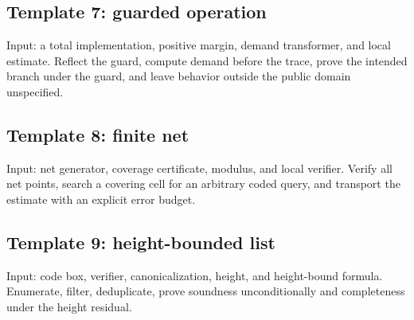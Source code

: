 \subsection{Template 7: guarded operation}
Input: a total implementation, positive margin, demand transformer, and local estimate.  Reflect the guard, compute demand before the trace, prove the intended branch under the guard, and leave behavior outside the public domain unspecified.

\subsection{Template 8: finite net}
Input: net generator, coverage certificate, modulus, and local verifier.  Verify all net points, search a covering cell for an arbitrary coded query, and transport the estimate with an explicit error budget.

\subsection{Template 9: height-bounded list}
Input: code box, verifier, canonicalization, height, and height-bound formula.  Enumerate, filter, deduplicate, prove soundness unconditionally and completeness under the height residual.
